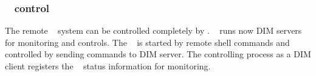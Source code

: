 \subsubsection{\mbs~ control}
The remote \mbs~ system can be controlled completely by \dabc.
\mbs~ runs now DIM servers for monitoring and controls.
The \mbs~ is started by remote shell commands and controlled by
sending commands to DIM server. The controlling process as a DIM client
registers the \mbs~ status information for monitoring.
